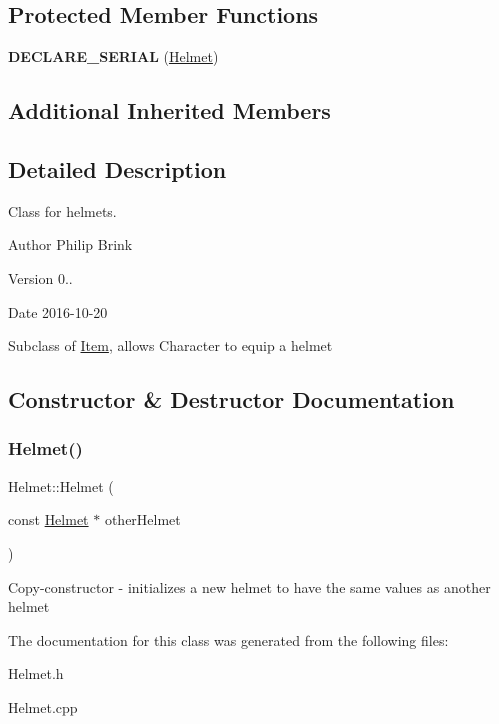 \subsection*{Protected Member Functions}
\begin{DoxyCompactItemize}
\item 
\hypertarget{class_helmet_a4d6756de7cf75e7cf04548c74d045ae2}{}\label{class_helmet_a4d6756de7cf75e7cf04548c74d045ae2} 
{\bfseries D\+E\+C\+L\+A\+R\+E\+\_\+\+S\+E\+R\+I\+AL} (\hyperlink{class_helmet}{Helmet})
\end{DoxyCompactItemize}
\subsection*{Additional Inherited Members}


\subsection{Detailed Description}
Class for helmets. 

\begin{DoxyAuthor}{Author}
Philip Brink 
\end{DoxyAuthor}
\begin{DoxyVersion}{Version}
0.. 
\end{DoxyVersion}
\begin{DoxyDate}{Date}
2016-\/10-\/20
\end{DoxyDate}
Subclass of \hyperlink{class_item}{Item}, allows Character to equip a helmet 

\subsection{Constructor \& Destructor Documentation}
\hypertarget{class_helmet_a27eceb089c04d2dcab69d49d30d7b92c}{}\label{class_helmet_a27eceb089c04d2dcab69d49d30d7b92c} 
\subsubsection{\texorpdfstring{Helmet()}{Helmet()}}
{\footnotesize\ttfamily Helmet\+::\+Helmet (\begin{DoxyParamCaption}\item[{const \hyperlink{class_helmet}{Helmet} $\ast$}]{other\+Helmet }\end{DoxyParamCaption})}

Copy-\/constructor -\/ initializes a new helmet to have the same values as another helmet 

The documentation for this class was generated from the following files\+:\begin{DoxyCompactItemize}
\item 
Helmet.\+h\item 
Helmet.\+cpp\end{DoxyCompactItemize}
